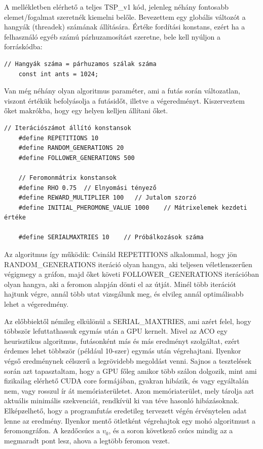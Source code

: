 A mellékletben elérhető a teljes TSP\_v1 kód, jelenleg néhány fontosabb elemet/fogalmat szeretnék kiemelni belőle.
Bevezettem egy globális változót a hangyák (threadek) számának állítására. Értéke fordítási konstans, ezért ha a felhasználó egyéb számú párhuzamosítást szeretne, bele kell nyúljon a forráskódba:

\begin{lstlisting}[style=CStyle]
	// Hangyák száma = párhuzamos szálak száma
	const int ants = 1024;
\end{lstlisting}

Van még néhány olyan algoritmus paraméter, ami a futás során változatlan, viszont értékük befolyásolja a futásidőt, illetve a végeredményt. Kiszerveztem őket makrókba, hogy egy helyen kelljen állítani őket.

\begin{lstlisting}[style=CStyle]
	// Iterációszámot állító konstansok
	#define REPETITIONS 10
	#define RANDOM_GENERATIONS 20
	#define FOLLOWER_GENERATIONS 500
	
	// Feromonmátrix konstansok
	#define RHO 0.75  // Elnyomási tényező
	#define REWARD_MULTIPLIER 100   // Jutalom szorzó
	#define INITIAL_PHEROMONE_VALUE 1000    // Mátrixelemek kezdeti értéke
	
	#define SERIALMAXTRIES 10    // Próbálkozások száma
\end{lstlisting}

Az algoritmus így működik: Csináld REPETITIONS alkalommal, hogy jön RANDOM\_GENERATIONS iteráció olyan hangya, aki teljesen véletlenszerűen végigmegy a gráfon, majd őket követi FOLLOWER\_GENERATIONS iterációban olyan hangya, aki a feromon alapján dönti el az útját. Minél több iterációt hajtunk végre, annál több utat vizsgálunk meg, és elvileg annál optimálisabb lehet a végeredmény.

Az előbbiektől némileg elkülönül a SERIAL\_MAXTRIES, ami azért felel, hogy többször lefuttathassuk egymás után a GPU kernelt. Mivel az ACO egy heurisztikus algoritmus, futásonként más és más eredményt szolgáltat, ezért érdemes lehet többször (például 10-szer) egymás után végrehajtani. Ilyenkor végső eredménynek célszerű a legrövidebb megoldást venni. Sajnos a tesztelések során azt tapasztaltam, hogy a GPU főleg amikor több szálon dolgozik, mint ami fizikailag elérhető CUDA core formájában, gyakran hibázik, és vagy egyáltalán nem, vagy rosszul ír át memóriaterületet. Azon memóriaterület, mely tárolja azt aktuális minimális szekvenciát, rendkívül ki van téve hasonló hibázásoknak. Elképzelhető, hogy a programfutás eredetileg tervezett végén érvénytelen adat lenne az eredmény. Ilyenkor mentő ötletként végrehajtok egy mohó algoritmust a feromongráfon. A kezdőcsúcs a \(v_{0}\), és a soron következő csúcs mindig az a megmaradt pont lesz, ahova a legtöbb feromon vezet.

